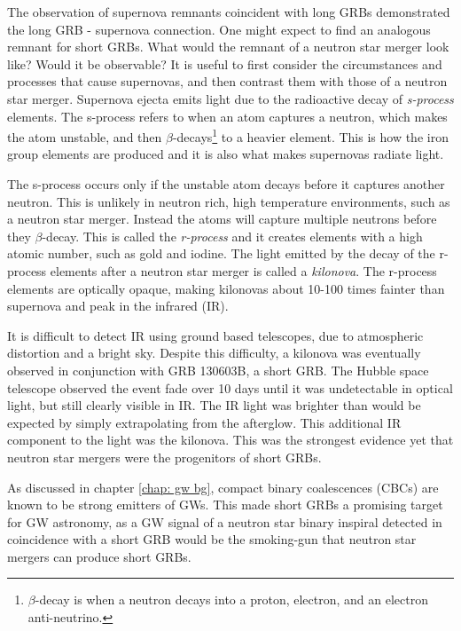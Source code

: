\documentclass[11pt]{cuthesis}
\begin{document}
The observation of supernova remnants coincident with long GRBs demonstrated the long GRB - supernova connection. One might expect to find an analogous remnant for short GRBs. What would the remnant of a neutron star merger look like? Would it be observable? It is useful to first consider the circumstances and processes that cause supernovas, and then contrast them with those of a neutron star merger. Supernova ejecta emits light due to the radioactive decay of \textit{s-process} elements. The s-process refers to when an atom captures a neutron, which makes the atom unstable, and then $\beta$-decays\footnote{$\beta$-decay is when a neutron decays into a proton, electron, and an electron anti-neutrino.} to a heavier element. This is how the iron group elements are produced and it is also what makes supernovas radiate light.

The s-process occurs only if the unstable atom decays before it captures another neutron. This is unlikely in neutron rich, high temperature environments, such as a neutron star merger. Instead the atoms will capture multiple neutrons before they $\beta$-decay. This is called the \textit{r-process} and it creates elements with a high atomic number, such as gold and iodine. The light emitted by the decay of the r-process elements after a neutron star merger is called a \textit{kilonova}. The r-process elements are optically opaque, making kilonovas about 10-100 times fainter than supernova and peak in the infrared (IR). 

It is difficult to detect IR using ground based telescopes, due to atmospheric distortion and a bright sky. Despite this difficulty, a kilonova was eventually observed in conjunction with GRB 130603B, a short GRB. The Hubble space telescope observed the event fade over 10 days until it was undetectable in optical light, but still clearly visible in IR. The IR light was brighter than would be expected by simply extrapolating from the afterglow. This additional IR component to the light was the kilonova. This was the strongest evidence yet that neutron star mergers were the progenitors of short GRBs. 

As discussed in chapter \ref{chap: gw bg}, compact binary coalescences (CBCs) are known to be strong emitters of GWs. This made short GRBs a promising target for GW astronomy, as a GW signal of a neutron star binary inspiral detected in coincidence with a short GRB would be the smoking-gun that neutron star mergers can produce short GRBs. 
\end{document}
